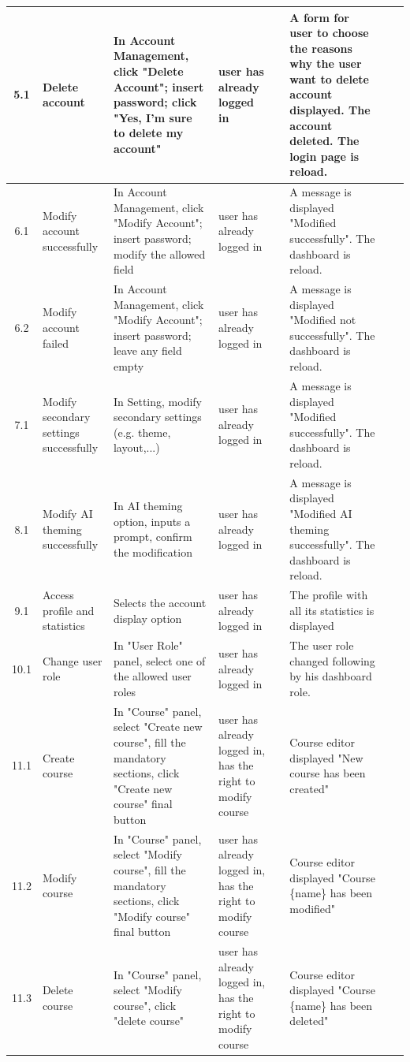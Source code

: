 \begin{longtable}{|c|m{1.5cm}|m{2.5cm}|m{2.5cm}|m{1.5cm}|m{2.5cm}|m{1.5cm}|m{1.5cm}|}
	5.1 & Delete account & In Account Management, click "Delete Account"; insert password; click "Yes, I'm sure to delete my account" & user has already logged in &  & A form for user to choose the reasons why the user want to delete account displayed. The account deleted. The login page is reload. &  &  \\ \hline
	6.1 & Modify account successfully & In Account Management, click "Modify Account"; insert password; modify the allowed field & user has already logged in &  & A message is displayed "Modified successfully". The dashboard is reload. &  &  \\ \hline
	6.2 & Modify account failed & In Account Management, click "Modify Account"; insert password; leave any field empty & user has already logged in &  & A message is displayed "Modified not successfully". The dashboard is reload. &  &  \\ \hline
	7.1 & Modify secondary settings successfully & In Setting, modify secondary settings (e.g. theme, layout,...) & user has already logged in &  & A message is displayed "Modified successfully". The dashboard is reload. &  &  \\ \hline
	8.1 & Modify AI theming successfully & In AI theming option, inputs a prompt, confirm the modification & user has already logged in &  & A message is displayed "Modified AI theming successfully". The dashboard is reload. &  &  \\ \hline
	9.1 & Access profile and statistics & Selects the account display option & user has already logged in &  & The profile with all its statistics is displayed &  &  \\ \hline
	10.1 & Change user role & In "User Role" panel, select one of the allowed user roles & user has already logged in &  & The user role changed following by his dashboard role. &  &  \\ \hline
	11.1 & Create course & In "Course" panel, select "Create new course", fill the mandatory sections, click "Create new course" final button & user has already logged in, has the right to modify course &  & Course editor displayed "New course has been created" &  &  \\ \hline
	11.2 & Modify course & In "Course" panel, select "Modify course", fill the mandatory sections, click "Modify course" final button & user has already logged in, has the right to modify course &  & Course editor displayed "Course \{name\} has been modified" &  &  \\ \hline
	11.3 & Delete course & In "Course" panel, select "Modify course", click "delete course" & user has already logged in, has the right to modify course &  & Course editor displayed "Course \{name\} has been deleted" &  &  \\ \hline

\end{longtable}
